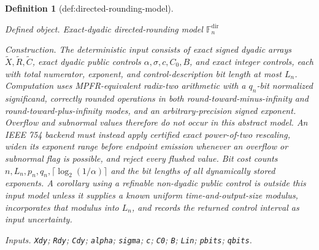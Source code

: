 \documentclass{article}
\newtheorem{definition}{Definition}
\begin{document}
\begin{definition}[def:directed-rounding-model]\label{def:directed-rounding-model}
\par\smallskip\noindent\emph{Defined object.} Exact-dyadic directed-rounding model \(\mathbb F_n^{\mathrm{dir}}\)
\par\smallskip\noindent\emph{Construction.} The deterministic input consists of exact signed dyadic arrays \(\widetilde X,\widetilde R,\widetilde C\), exact dyadic public controls \(\alpha,\sigma,c,C_0,B\), and exact integer controls, each with total numerator, exponent, and control-description bit length at most \(L_n\).  Computation uses MPFR-equivalent radix-two arithmetic with a \(q_n\)-bit normalized significand, correctly rounded operations in both round-toward-minus-infinity and round-toward-plus-infinity modes, and an arbitrary-precision signed exponent.  Overflow and subnormal values therefore do not occur in this abstract model.  An IEEE 754 backend must instead apply certified exact power-of-two rescaling, widen its exponent range before endpoint emission whenever an overflow or subnormal flag is possible, and reject every flushed value.  Bit cost counts \(n,L_n,p_n,q_n,\lceil\log_2(1/\alpha)\rceil\) and the bit lengths of all dynamically stored exponents.  A corollary using a refinable non-dyadic public control is outside this input model unless it supplies a known uniform time-and-output-size modulus, incorporates that modulus into \(L_n\), and records the returned control interval as input uncertainty.
\par\smallskip\noindent\emph{Inputs.} \texttt{Xdy}; \texttt{Rdy}; \texttt{Cdy}; \texttt{alpha}; \texttt{sigma}; \texttt{c}; \texttt{C0}; \texttt{B}; \texttt{Lin}; \texttt{pbits}; \texttt{qbits}.
\end{definition}
\end{document}
